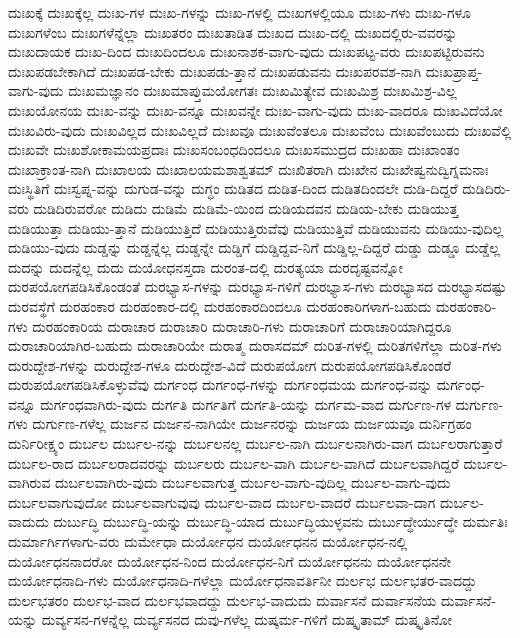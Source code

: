 {ದುಃಖಕ್ಕೆ
ದುಃಖಕ್ಕೆಲ್ಲ
ದುಃಖ-ಗಳ
ದುಃಖ-ಗಳನ್ನು
ದುಃಖ-ಗಳಲ್ಲಿ
ದುಃಖಗಳಲ್ಲಿಯೂ
ದುಃಖ-ಗಳು
ದುಃಖ-ಗಳೂ
ದುಃಖಗಳೆಂಬ
ದುಃಖಗಳೆನ್ನೆಲ್ಲಾ
ದುಃಖತರಂ
ದುಃಖತಾಡಿತ
ದುಃಖದ
ದುಃಖ-ದಲ್ಲಿ
ದುಃಖದಲ್ಲಿರು-ವವರನ್ನು
ದುಃಖದಾಯಕ
ದುಃಖ-ದಿಂದ
ದುಃಖದಿಂದಲೂ
ದುಃಖನಾಶಕ-ವಾಗು-ವುದು
ದುಃಖಪಟ್ಟ-ವರು
ದುಃಖಪಟ್ಟಿರುವನು
ದುಃಖಪಡಬೇಕಾಗಿದೆ
ದುಃಖಪಡ-ಬೇಕು
ದುಃಖಪಡು-ತ್ತಾನೆ
ದುಃಖಪಡುವನು
ದುಃಖಪರವಶ-ನಾಗಿ
ದುಃಖಪ್ರಾಪ್ತ-ವಾಗು-ವುದು
ದುಃಖಮಜ್ಞಾನಂ
ದುಃಖಮಾಪ್ತುಮಯೋಗತಃ
ದುಃಖಮಿತ್ಯೇವ
ದುಃಖಮಿಶ್ರ
ದುಃಖಮಿಶ್ರ-ವಿಲ್ಲ
ದುಃಖಯೋನಯ
ದುಃಖ-ವನ್ನು
ದುಃಖ-ವನ್ನೂ
ದುಃಖವನ್ನೇ
ದುಃಖ-ವಾಗು-ವುದು
ದುಃಖ-ವಾದರೂ
ದುಃಖವಿದೆಯೋ
ದುಃಖವಿರು-ವುದು
ದುಃಖವಿಲ್ಲದ
ದುಃಖವಿಲ್ಲದೆ
ದುಃಖವೂ
ದುಃಖವೆಂತಲೂ
ದುಃಖವೆಂಬ
ದುಃಖವೆಂಬುದು
ದುಃಖವೆಲ್ಲಿ
ದುಃಖವೇ
ದುಃಖಶೋಕಾಮಯಪ್ರದಾಃ
ದುಃಖಸಂಬಂಧದಿಂದಲೂ
ದುಃಖಸಮುದ್ರದ
ದುಃಖಹಾ
ದುಃಖಾಂತಂ
ದುಃಖಾಕ್ರಾಂತ-ನಾಗಿ
ದುಃಖಾಲಯ
ದುಃಖಾಲಯಮಶಾಶ್ವತಮ್
ದುಃಖಿತರಾಗಿ
ದುಃಖೇನ
ದುಃಖೇಷ್ವನುದ್ವಿಗ್ನಮನಾಃ
ದುಃಸ್ಥಿತಿಗೆ
ದುಃಸ್ವಪ್ನ-ವನ್ನು
ದುಗುಡ-ವನ್ನು
ದುಗ್ಧಂ
ದುಡಿತದ
ದುಡಿತ-ದಿಂದ
ದುಡಿತದಿಂದಲೇ
ದುಡಿ-ದಿದ್ದರೆ
ದುಡಿದಿರು-ವರು
ದುಡಿದಿರುವರೋ
ದುಡಿದು
ದುಡಿಮೆ
ದುಡಿಮೆ-ಯಿಂದ
ದುಡಿಯದವನ
ದುಡಿಯ-ಬೇಕು
ದುಡಿಯುತ್ತ
ದುಡಿಯುತ್ತಾ
ದುಡಿಯು-ತ್ತಾನೆ
ದುಡಿಯುತ್ತಿದೆ
ದುಡಿಯುತ್ತಿರುವೆವು
ದುಡಿಯುತ್ತಿವೆ
ದುಡಿಯುವನು
ದುಡಿಯು-ವುದಿಲ್ಲ
ದುಡಿಯು-ವುದು
ದುಡ್ಡನ್ನು
ದುಡ್ಡನ್ನೆಲ್ಲ
ದುಡ್ಡನ್ನೇ
ದುಡ್ಡಿಗೆ
ದುಡ್ಡಿದ್ದವ-ನಿಗೆ
ದುಡ್ಡಿಲ್ಲ-ದಿದ್ದರೆ
ದುಡ್ಡು
ದುಡ್ಡೂ
ದುಡ್ಡೆಲ್ಲ
ದುದನ್ನು
ದುದನ್ನೆಲ್ಲ
ದುದು
ದುಯೋಧನಸ್ತದಾ
ದುರಂತ-ದಲ್ಲಿ
ದುರತ್ಯಯಾ
ದುರದೃಷ್ಟವನ್ನೋ
ದುರಪಯೋಗಪಡಿಸಿಕೊಂಡಂತೆ
ದುರಭ್ಯಾಸ-ಗಳನ್ನು
ದುರಭ್ಯಾಸ-ಗಳಿಗೆ
ದುರಭ್ಯಾಸ-ಗಳು
ದುರಭ್ಯಾಸದ
ದುರಭ್ಯಾಸದಷ್ಟು
ದುರವಸ್ಥೆಗೆ
ದುರಹಂಕಾರ
ದುರಹಂಕಾರ-ದಲ್ಲಿ
ದುರಹಂಕಾರದಿಂದಲೂ
ದುರಹಂಕಾರಿಗಳಾಗ-ಬಹುದು
ದುರಹಂಕಾರಿ-ಗಳು
ದುರಹಂಕಾರಿಯ
ದುರಾಚಾರ
ದುರಾಚಾರಿ
ದುರಾಚಾರಿ-ಗಳು
ದುರಾಚಾರಿಗೆ
ದುರಾಚಾರಿಯಾಗಿದ್ದರೂ
ದುರಾಚಾರಿಯಾಗಿರ-ಬಹುದು
ದುರಾಚಾರಿಯೇ
ದುರಾತ್ಮ
ದುರಾಸದಮ್
ದುರಿತ-ಗಳಲ್ಲಿ
ದುರಿತಗಳಿಗೆಲ್ಲಾ
ದುರಿತ-ಗಳು
ದುರುದ್ದೇಶ-ಗಳನ್ನು
ದುರುದ್ದೇಶ-ಗಳೂ
ದುರುದ್ದೇಶ-ವಿದೆ
ದುರುಪಯೋಗ
ದುರುಪಯೋಗಪಡಿಸಿಕೊಂಡರೆ
ದುರುಪಯೋಗಪಡಿಸಿಕೊಳ್ಳುವೆವು
ದುರ್ಗಂಧ
ದುರ್ಗಂಧ-ಗಳನ್ನು
ದುರ್ಗಂಧಮಯ
ದುರ್ಗಂಧ-ವನ್ನು
ದುರ್ಗಂಧ-ವನ್ನೂ
ದುರ್ಗಂಧವಾಗಿರು-ವುದು
ದುರ್ಗತಿ
ದುರ್ಗತಿಗೆ
ದುರ್ಗತಿ-ಯನ್ನು
ದುರ್ಗಮ-ವಾದ
ದುರ್ಗುಣ-ಗಳ
ದುರ್ಗುಣ-ಗಳು
ದುರ್ಗುಣ-ಗಳೆಲ್ಲ
ದುರ್ಜನ
ದುರ್ಜನ-ನಾಗಿಯೇ
ದುರ್ಜನರನ್ನು
ದುರ್ಜಯ
ದುರ್ಜಯವೂ
ದುರ್ನಿಗ್ರಹಂ
ದುರ್ನಿರೀಕ್ಷ್ಯಂ
ದುರ್ಬಲ
ದುರ್ಬಲ-ನನ್ನು
ದುರ್ಬಲನಲ್ಲ
ದುರ್ಬಲ-ನಾಗಿ
ದುರ್ಬಲನಾಗಿರು-ವಾಗ
ದುರ್ಬಲರಾಗುತ್ತಾರೆ
ದುರ್ಬಲ-ರಾದ
ದುರ್ಬಲರಾದವರನ್ನು
ದುರ್ಬಲರು
ದುರ್ಬಲ-ವಾಗಿ
ದುರ್ಬಲ-ವಾಗಿದೆ
ದುರ್ಬಲವಾಗಿದ್ದರೆ
ದುರ್ಬಲ-ವಾಗಿರುವ
ದುರ್ಬಲವಾಗಿರು-ವುದು
ದುರ್ಬಲವಾಗುತ್ತ
ದುರ್ಬಲ-ವಾಗು-ವುದಿಲ್ಲ
ದುರ್ಬಲ-ವಾಗು-ವುದು
ದುರ್ಬಲವಾಗುವುದೋ
ದುರ್ಬಲವಾಗುವುವು
ದುರ್ಬಲ-ವಾದ
ದುರ್ಬಲ-ವಾದರೆ
ದುರ್ಬಲವಾ-ದಾಗ
ದುರ್ಬಲ-ವಾದುದು
ದುರ್ಬುದ್ಧಿ
ದುರ್ಬುದ್ಧಿ-ಯನ್ನು
ದುರ್ಬುದ್ಧಿ-ಯಾದ
ದುರ್ಬುದ್ಧಿಯುಳ್ಳವನು
ದುರ್ಬುದ್ಧೇರ್ಯುದ್ಧೇ
ದುರ್ಮತಿಃ
ದುರ್ಮಾರ್ಗಿಗಳಾಗು-ವರು
ದುರ್ಮೇಧಾ
ದುರ್ಯೋಧನ
ದುರ್ಯೋಧನನ
ದುರ್ಯೋಧನ-ನಲ್ಲಿ
ದುರ್ಯೋಧನನಾದರೋ
ದುರ್ಯೋಧನ-ನಿಂದ
ದುರ್ಯೋಧನ-ನಿಗೆ
ದುರ್ಯೋಧನನು
ದುರ್ಯೋಧನನೇ
ದುರ್ಯೋಧನಾದಿ-ಗಳು
ದುರ್ಯೋಧನಾದಿ-ಗಳೆಲ್ಲಾ
ದುರ್ಯೋಧನಾವರ್ತಿನೀ
ದುರ್ಲಭ
ದುರ್ಲಭತರ-ವಾದದ್ದು
ದುರ್ಲಭತರಂ
ದುರ್ಲಭ-ವಾದ
ದುರ್ಲಭವಾದದ್ದು
ದುರ್ಲಭ-ವಾದುದು
ದುರ್ವಾಸನೆ
ದುರ್ವಾಸನೆಯ
ದುರ್ವಾಸನೆ-ಯನ್ನು
ದುರ್ವ್ಯಸನ-ಗಳನ್ನೆಲ್ಲ
ದುರ್ವ್ಯಸನದ
ದುವು-ಗಳೆಲ್ಲ
ದುಷ್ಕರ್ಮ-ಗಳಿಗೆ
ದುಷ್ಕೃತಾಮ್
ದುಷ್ಕೃತಿನೋ
}
